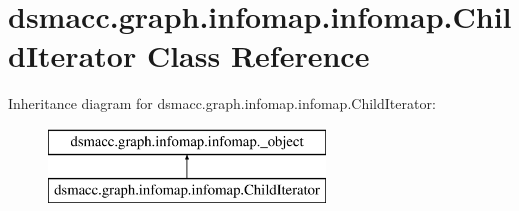 \hypertarget{classdsmacc_1_1graph_1_1infomap_1_1infomap_1_1ChildIterator}{}\section{dsmacc.\+graph.\+infomap.\+infomap.\+Child\+Iterator Class Reference}
\label{classdsmacc_1_1graph_1_1infomap_1_1infomap_1_1ChildIterator}
Inheritance diagram for dsmacc.\+graph.\+infomap.\+infomap.\+Child\+Iterator\+:\begin{figure}[H]
\begin{center}
\leavevmode
\includegraphics[height=2.000000cm]{classdsmacc_1_1graph_1_1infomap_1_1infomap_1_1ChildIterator}
\end{center}
\end{figure}
